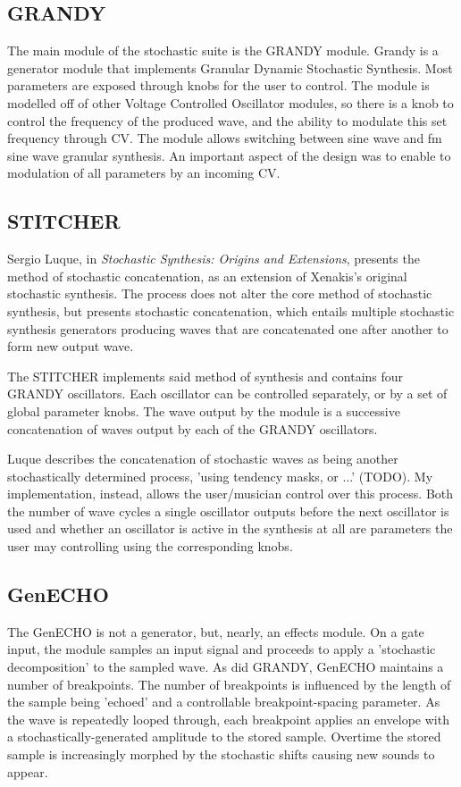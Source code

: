\documentclass[10pt]{article}
\begin{document}
\subsection{GRANDY}
The main module of the stochastic suite is the GRANDY module. Grandy is a generator module that implements Granular Dynamic Stochastic Synthesis. Most parameters are exposed through knobs for the user to control. The module is modelled off of other Voltage Controlled Oscillator modules, so there is a knob to control the frequency of the produced wave, and the ability to modulate this set frequency through CV. The module allows switching between sine wave and fm sine wave granular synthesis. An important aspect of the design was to enable to modulation of all parameters by an incoming CV.

\subsection{STITCHER}
Sergio Luque, in \textit{Stochastic Synthesis: Origins and Extensions}, presents the method of stochastic concatenation, as an extension of Xenakis's original stochastic synthesis.\citep{sergio2006} The process does not alter the core method of stochastic synthesis, but presents stochastic concatenation, which entails multiple stochastic synthesis generators producing waves that are concatenated one after another to form new output wave. 

The STITCHER implements said method of synthesis and contains four GRANDY oscillators. Each oscillator can be controlled separately, or by a set of global parameter knobs. The wave output by the module is a successive concatenation of waves output by each of the GRANDY oscillators.

Luque describes the concatenation of stochastic waves as being another stochastically determined process, 'using tendency masks, or ...' (TODO).\citep{sergio2006} My implementation, instead, allows the user/musician control over this process. Both the number of wave cycles a single oscillator outputs before the next oscillator is used and whether an oscillator is active in the synthesis at all are parameters the user may controlling using the corresponding knobs.

\subsection{GenECHO}
The GenECHO is not a generator, but, nearly, an effects module. On a gate input, the module samples an input signal and proceeds to apply a 'stochastic decomposition' to the sampled wave. As did GRANDY, GenECHO maintains a number of breakpoints. The number of breakpoints is influenced by the length of the sample being 'echoed' and a controllable breakpoint-spacing parameter. As the wave is repeatedly looped through, each breakpoint applies an envelope with a stochastically-generated amplitude to the stored sample. Overtime the stored sample is increasingly morphed by the stochastic shifts causing new sounds to appear.
\end{document}
